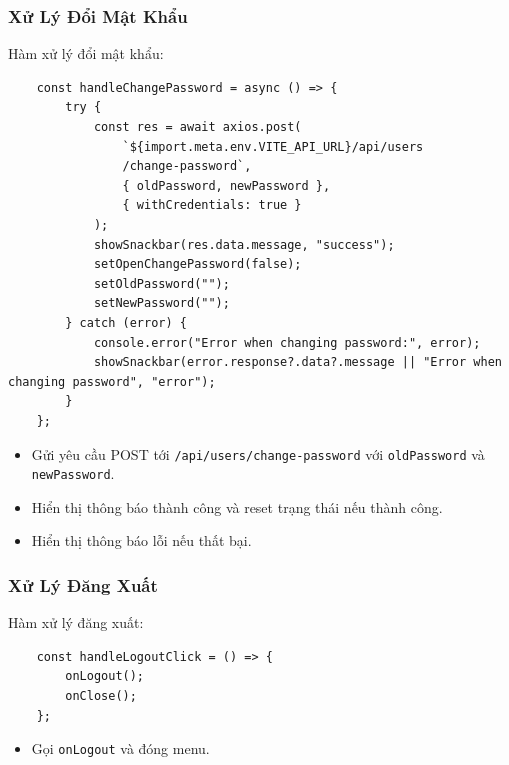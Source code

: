             \subsubsection{Xử Lý Đổi Mật Khẩu}
                \hspace*{0.6cm}Hàm xử lý đổi mật khẩu:
                \begin{lstlisting}
    const handleChangePassword = async () => {
        try {
            const res = await axios.post(
                `${import.meta.env.VITE_API_URL}/api/users
                /change-password`,
                { oldPassword, newPassword },
                { withCredentials: true }
            );
            showSnackbar(res.data.message, "success");
            setOpenChangePassword(false);
            setOldPassword("");
            setNewPassword("");
        } catch (error) {
            console.error("Error when changing password:", error);
            showSnackbar(error.response?.data?.message || "Error when changing password", "error");
        }
    };
                \end{lstlisting}
                \begin{itemize}
                    \item Gửi yêu cầu POST tới \texttt{/api/users/change-password} với \texttt{oldPassword} và \texttt{newPassword}.
                    \item Hiển thị thông báo thành công và reset trạng thái nếu thành công.
                    \item Hiển thị thông báo lỗi nếu thất bại.
                \end{itemize}

            \subsubsection{Xử Lý Đăng Xuất}
                \hspace*{0.6cm}Hàm xử lý đăng xuất:
                \begin{lstlisting}
    const handleLogoutClick = () => {
        onLogout();
        onClose();
    };
                \end{lstlisting}
                \begin{itemize}
                    \item Gọi \texttt{onLogout} và đóng menu.
                \end{itemize}

